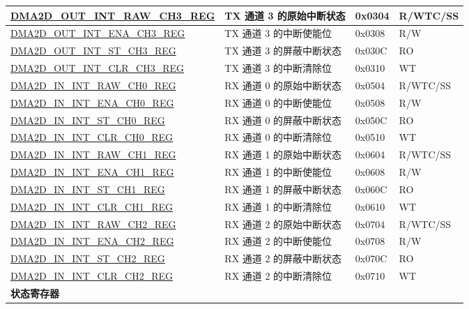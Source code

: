 \begin{longtable}{ | p{7cm} | p{11.5cm} | p{1.3cm} | p{2cm} | }
\hyperref[regdesc:DMA2DOUTINTRAWCHNREG]{DMA2D\_OUT\_INT\_RAW\_CH3\_REG} & TX 通道 3 的原始中断状态 & 0x0304 & R/WTC/SS \\ \hline
\hyperref[regdesc:DMA2DOUTINTENACHNREG]{DMA2D\_OUT\_INT\_ENA\_CH3\_REG} & TX 通道 3 的中断使能位 & 0x0308 & R/W \\ \hline
\hyperref[regdesc:DMA2DOUTINTSTCHNREG]{DMA2D\_OUT\_INT\_ST\_CH3\_REG} & TX 通道 3 的屏蔽中断状态 & 0x030C & RO \\ \hline
\hyperref[regdesc:DMA2DOUTINTCLRCHNREG]{DMA2D\_OUT\_INT\_CLR\_CH3\_REG} & TX 通道 3 的中断清除位 & 0x0310 & WT \\ \hline
\hyperref[regdesc:DMA2DININTRAWCHNREG]{DMA2D\_IN\_INT\_RAW\_CH0\_REG} & RX 通道 0 的原始中断状态 & 0x0504 & R/WTC/SS \\ \hline
\hyperref[regdesc:DMA2DININTENACHNREG]{DMA2D\_IN\_INT\_ENA\_CH0\_REG} & RX 通道 0 的中断使能位 & 0x0508 & R/W \\ \hline
\hyperref[regdesc:DMA2DININTSTCHNREG]{DMA2D\_IN\_INT\_ST\_CH0\_REG} & RX 通道 0 的屏蔽中断状态 & 0x050C & RO \\ \hline
\hyperref[regdesc:DMA2DININTCLRCHNREG]{DMA2D\_IN\_INT\_CLR\_CH0\_REG} & RX 通道 0 的中断清除位 & 0x0510 & WT \\ \hline
\hyperref[regdesc:DMA2DININTRAWCHNREG]{DMA2D\_IN\_INT\_RAW\_CH1\_REG} & RX 通道 1 的原始中断状态 & 0x0604 & R/WTC/SS \\ \hline
\hyperref[regdesc:DMA2DININTENACHNREG]{DMA2D\_IN\_INT\_ENA\_CH1\_REG} & RX 通道 1 的中断使能位 & 0x0608 & R/W \\ \hline
\hyperref[regdesc:DMA2DININTSTCHNREG]{DMA2D\_IN\_INT\_ST\_CH1\_REG} & RX 通道 1 的屏蔽中断状态 & 0x060C & RO \\ \hline
\hyperref[regdesc:DMA2DININTCLRCHNREG]{DMA2D\_IN\_INT\_CLR\_CH1\_REG} & RX 通道 1 的中断清除位 & 0x0610 & WT \\ \hline
\hyperref[regdesc:DMA2DININTRAWCHNREG]{DMA2D\_IN\_INT\_RAW\_CH2\_REG} & RX 通道 2 的原始中断状态 & 0x0704 & R/WTC/SS \\ \hline
\hyperref[regdesc:DMA2DININTENACHNREG]{DMA2D\_IN\_INT\_ENA\_CH2\_REG} & RX 通道 2 的中断使能位 & 0x0708 & R/W \\ \hline
\hyperref[regdesc:DMA2DININTSTCHNREG]{DMA2D\_IN\_INT\_ST\_CH2\_REG} & RX 通道 2 的屏蔽中断状态 & 0x070C & RO \\ \hline
\hyperref[regdesc:DMA2DININTCLRCHNREG]{DMA2D\_IN\_INT\_CLR\_CH2\_REG} & RX 通道 2 的中断清除位  & 0x0710 & WT \\ \hline
\multicolumn{4}{|l|}{\textbf{状态寄存器}} \\ \hline

\end{longtable}
